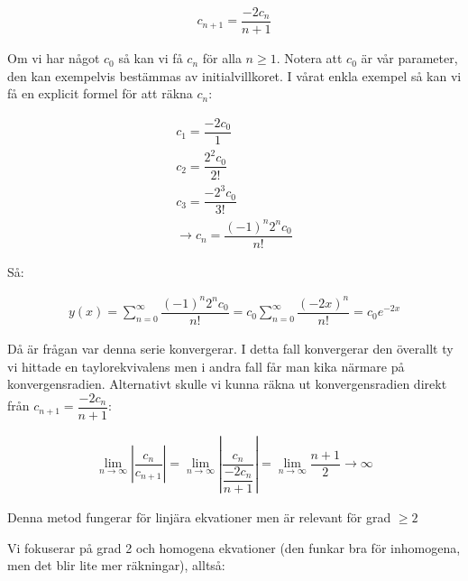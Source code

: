 \begin{equation*}
  \begin{gathered}
    c_{n+1}=\dfrac{-2c_n}{n+1}
  \end{gathered}
\end{equation*}
\par\bigskip
\noindent Om vi har något $c_0$ så kan vi få $c_n$ för alla $n\geq1$. Notera att $c_0$ är vår parameter, den kan exempelvis bestämmas av initialvillkoret. I vårat enkla exempel så kan vi få en explicit formel för att räkna $c_n$:


\begin{equation*}
  \begin{gathered}
    c_1 = \dfrac{-2c_0}{1}\\
    c_2 = \dfrac{2^2c_0}{2!}\\
    c_3 = \dfrac{-2^3c_0}{3!}\\
    \rightarrow c_n=\dfrac{(-1)^n2^nc_0}{n!}
  \end{gathered}
\end{equation*}
\par\bigskip
\noindent Så:


\begin{equation*}
  \begin{gathered}
    y(x) = \sum_{n=0}^{\infty}\dfrac{(-1)^n2^nc_0}{n!} = c_0\sum_{n=0}^{\infty}\dfrac{(-2x)^n}{n!} = c_0e^{-2x}
  \end{gathered}
\end{equation*}
\par\bigskip
\noindent Då är frågan var denna serie konvergerar. I detta fall konvergerar den överallt ty vi hittade en taylorekvivalens men i andra fall får man kika närmare på konvergensradien. Alternativt skulle vi kunna räkna ut konvergensradien direkt från $c_{n+1} = \dfrac{-2c_n}{n+1}$:


\begin{equation*}
  \begin{gathered}
    \lim_{n\to\infty}\left|\dfrac{c_n}{c_{n+1}}\right| = \lim_{n\to\infty}\left|\dfrac{c_n}{\dfrac{-2c_n}{n+1}}\right| = \lim_{n\to\infty}\dfrac{n+1}{2}\rightarrow\infty
  \end{gathered}
\end{equation*}
\par\bigskip
\noindent Denna metod fungerar för linjära ekvationer men är relevant för grad $\geq2$
\par\bigskip
\noindent Vi fokuserar på grad 2 och homogena ekvationer (den funkar bra för inhomogena, men det blir lite mer räkningar), alltså:


